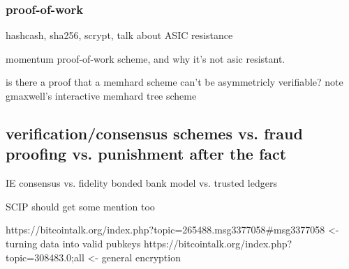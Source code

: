 \documentclass{article}
\begin{document}
\subsubsection{proof-of-work}

hashcash, sha256, scrypt, talk about ASIC resistance

momentum proof-of-work scheme, and why it's not asic resistant.

is there a proof that a memhard scheme can't be asymmetricly verifiable? note
gmaxwell's interactive memhard tree scheme


\subsection{verification/consensus schemes vs. fraud proofing vs. punishment after the fact}

IE consensus vs. fidelity bonded bank model vs. trusted ledgers

SCIP should get some mention too



https://bitcointalk.org/index.php?topic=265488.msg3377058#msg3377058 <- turning data into valid pubkeys
https://bitcointalk.org/index.php?topic=308483.0;all <- general encryption



\end{document}

